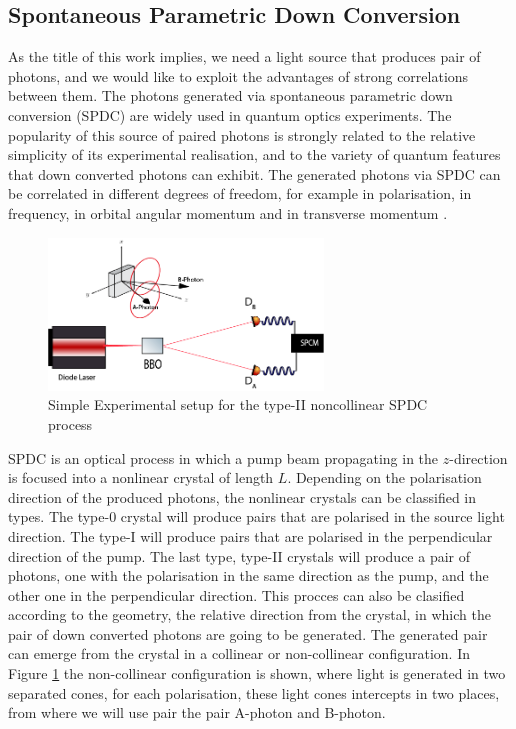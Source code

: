 \subsection{Spontaneous Parametric Down Conversion}

As the title of this work implies, we need a light source that produces pair of photons, 
and we would like to exploit the advantages of strong correlations between them.
The photons generated via spontaneous parametric down conversion (SPDC) are
widely used in quantum optics experiments. The popularity of this source of paired
photons is strongly related to the relative simplicity of its experimental
realisation, and to the variety of quantum features that down converted photons can exhibit. 
The generated photons via SPDC can be correlated in different degrees of freedom, for example 
in polarisation, in frequency, in orbital angular momentum and in transverse momentum \cite{spatiocorrelations}.\\

\begin{figure}[h!]
\centering
 \includegraphics[width=0.65\textwidth]{Figures/spdcSimple.png}
 \caption{Simple Experimental setup for the type-II noncollinear SPDC process}
\label{fig:spdcSimple} 
\end{figure}


SPDC is an optical process in which a pump beam propagating in the $z$-direction is focused into a nonlinear crystal of length $L$. 
Depending on the polarisation direction of the produced photons, the nonlinear crystals 
can be classified in types. 
The type-0 crystal will produce pairs that are polarised in the source light direction. 
The type-I will produce pairs that are polarised in the perpendicular direction of the pump. 
The last type, type-II crystals will produce a pair of photons, 
one with the polarisation in the same direction as the pump, 
and the other one in the perpendicular direction. 
This procces can also be clasified according to the geometry, the relative direction from the crystal,
 in which the pair of down converted photons are going to be generated. The generated
 pair can emerge from the crystal in a collinear or non-collinear configuration. 
In Figure \ref{fig:spdcSimple} the non-collinear configuration is shown, where light is generated in two separated 
cones, for each polarisation, these light cones intercepts in two places, from where we will use pair the pair A-photon and B-photon.

